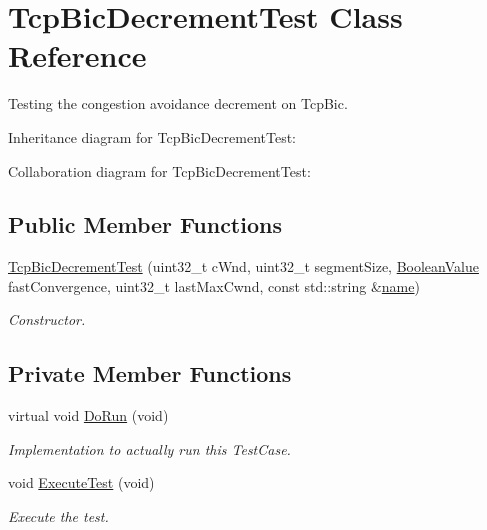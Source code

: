 \hypertarget{classTcpBicDecrementTest}{}\section{Tcp\+Bic\+Decrement\+Test Class Reference}
\label{classTcpBicDecrementTest}


Testing the congestion avoidance decrement on Tcp\+Bic.  




Inheritance diagram for Tcp\+Bic\+Decrement\+Test\+:


Collaboration diagram for Tcp\+Bic\+Decrement\+Test\+:
\subsection*{Public Member Functions}
\begin{DoxyCompactItemize}
\item 
\hyperlink{classTcpBicDecrementTest_ace79e0062557a4d442f59d1a6a8c8549}{Tcp\+Bic\+Decrement\+Test} (uint32\+\_\+t c\+Wnd, uint32\+\_\+t segment\+Size, \hyperlink{classns3_1_1BooleanValue}{Boolean\+Value} fast\+Convergence, uint32\+\_\+t last\+Max\+Cwnd, const std\+::string \&\hyperlink{generate__test__data__lte__spectrum__model_8m_ab74e6bf80237ddc4109968cedc58c151}{name})
\begin{DoxyCompactList}\small\item\em Constructor. \end{DoxyCompactList}\end{DoxyCompactItemize}
\subsection*{Private Member Functions}
\begin{DoxyCompactItemize}
\item 
virtual void \hyperlink{classTcpBicDecrementTest_ac402ffc36b63361b8abd4935d043f48d}{Do\+Run} (void)
\begin{DoxyCompactList}\small\item\em Implementation to actually run this Test\+Case. \end{DoxyCompactList}\item 
void \hyperlink{classTcpBicDecrementTest_ac43685ed144fb8439ad966e912d25248}{Execute\+Test} (void)
\begin{DoxyCompactList}\small\item\em Execute the test. \end{DoxyCompactList}\end{DoxyCompactItemize}

